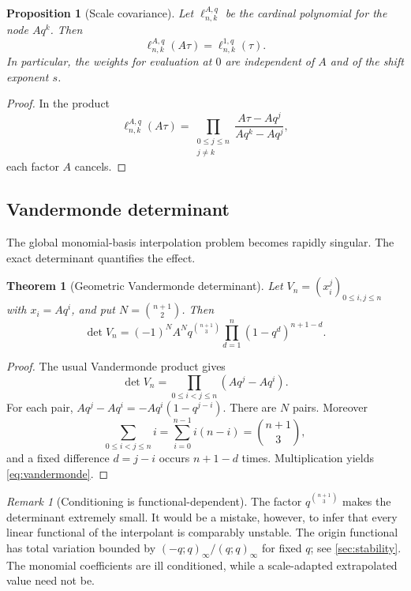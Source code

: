\documentclass[11pt,oneside]{article}
\numberwithin{equation}{section}
\newtheorem{theorem}{Theorem}[section]
\newtheorem{proposition}[proposition]{Proposition}
\theoremstyle{definition}
\theoremstyle{remark}
\newtheorem{remark}[remark]{Remark}
\begin{document}
\begin{proposition}[Scale covariance]
Let $\ell_{n,k}^{A,q}$ be the cardinal polynomial for the node $Aq^k$.
Then
\[
 \ell_{n,k}^{A,q}(A\tau)=\ell_{n,k}^{1,q}(\tau).
\]
In particular, the weights for evaluation at $0$ are independent of $A$ and of
the shift exponent $s$.
\end{proposition}

\begin{proof}
In the product
\[
 \ell_{n,k}^{A,q}(A\tau)
 =\prod_{\substack{0\le j\le n\\j\ne k}}
   \frac{A\tau-Aq^j}{Aq^k-Aq^j},
\]
each factor $A$ cancels.
\end{proof}

\subsection{Vandermonde determinant}

The global monomial-basis interpolation problem becomes rapidly singular.
The exact determinant quantifies the effect.

\begin{theorem}[Geometric Vandermonde determinant]
Let $V_n=(x_i^j)_{0\le i,j\le n}$ with $x_i=Aq^i$, and put
$N=\binom{n+1}{2}$.  Then
\begin{equation}
 \det V_n
 =(-1)^N A^N q^{\binom{n+1}{3}}
   \prod_{d=1}^n(1-q^d)^{n+1-d}.
 \label{eq:vandermonde}
\end{equation}
\end{theorem}

\begin{proof}
The usual Vandermonde product gives
\[
 \det V_n=\prod_{0\le i<j\le n}(Aq^j-Aq^i).
\]
For each pair,
$Aq^j-Aq^i=-Aq^i(1-q^{j-i})$.  There are $N$ pairs.  Moreover
\[
 \sum_{0\le i<j\le n}i
 =\sum_{i=0}^{n-1}i(n-i)=\binom{n+1}{3},
\]
and a fixed difference $d=j-i$ occurs $n+1-d$ times.  Multiplication yields
\eqref{eq:vandermonde}.
\end{proof}

\begin{remark}[Conditioning is functional-dependent]
The factor $q^{\binom{n+1}{3}}$ makes the determinant extremely small.  It
would be a mistake, however, to infer that every linear functional of the
interpolant is comparably unstable.  The origin functional has total variation
bounded by $(-q;q)_\infty/(q;q)_\infty$ for fixed $q$; see
\cref{sec:stability}.  The monomial coefficients are ill conditioned, while a
scale-adapted extrapolated value need not be.
\end{remark}
\end{document}
